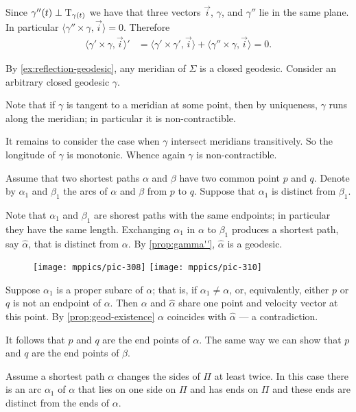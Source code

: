 Since $\gamma''(t)\perp\mathrm{T}_{\gamma(t)}$ we have that three vectors $\vec i$, $\gamma$, and $\gamma''$ lie in the same plane.
In particular $\langle\gamma''\times \gamma,\vec i\rangle=0$.
Therefore
\begin{align*}
\langle\gamma'\times \gamma,\vec i\rangle'
&=
\langle\gamma'\times \gamma',\vec i\rangle+\langle\gamma''\times \gamma,\vec i\rangle =0.
\end{align*}



By \ref{ex:reflection-geodesic}, any meridian of $\Sigma$ is a closed geodesic.
Consider an arbitrary closed geodesic $\gamma$.

Note that if $\gamma$ is tangent to a meridian at some point, then by uniqueness, $\gamma$ runs along the meridian; in particular it is non-contractible.

It remains to consider the case when $\gamma$ intersect meridians transitively.
So the longitude of $\gamma$ is monotonic.
Whence again $\gamma$ is non-contractible.

Assume that two shortest paths $\alpha$ and $\beta$ have two common point $p$ and $q$.
Denote by $\alpha_1$ and $\beta_1$ the arcs of
$\alpha$ and $\beta$ from $p$ to $q$.
Suppose that $\alpha_1$ is distinct from $\beta_1$.

Note that $\alpha_1$ and $\beta_1$ are shorest paths with the same endpoints;
in particular they have the same length.
Exchanging $\alpha_1$ in $\alpha$ to $\beta_1$ produces a shortest path, say $\hat\alpha$, that is distinct from $\alpha$.
By \ref{prop:gamma''}, $\hat\alpha$ is a geodesic.

\begin{wrapfigure}[11]{r}{38 mm}
\vskip-5mm
\centering
\texttt{[image: mppics/pic-308]}
\bigskip
\texttt{[image: mppics/pic-310]}
\vskip0mm
\end{wrapfigure}

Suppose $\alpha_1$ is a proper subarc of $\alpha$;
that is, if $\alpha_1\ne\alpha$, or, equivalently, either $p$ or $q$ is not an endpoint of $\alpha$.
Then $\alpha$ and $\hat\alpha$ share one point and velocity vector at this point.
By \ref{prop:geod-existence} $\alpha$ coincides with $\hat\alpha$ --- a contradiction.

It follows that $p$ and $q$ are the end points of $\alpha$.
The same way we can show that $p$ and $q$ are the end points of $\beta$.

Assume a shortest path $\alpha$ changes the sides of $\Pi$ at least twice.
In this case there is an arc $\alpha_1$ of $\alpha$ that lies on one side on $\Pi$ and has ends on $\Pi$ and these ends are distinct from the ends of $\alpha$.

